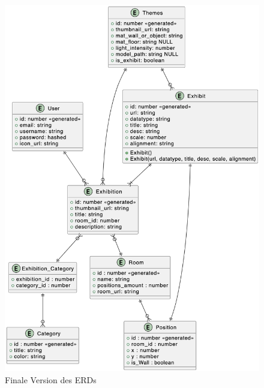 \begin{figure}
    \centering
    \includegraphics[scale=0.5]{pics/lastversion_erd.png}
    \caption{Finale Version des ERDs}
    \label{fig:erd:lastversion}
\end{figure}












